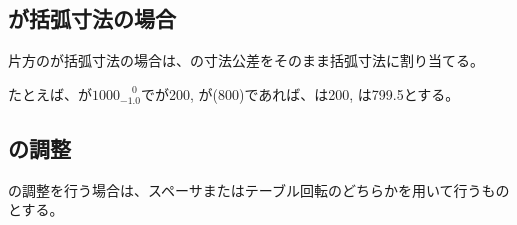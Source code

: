 \subsection{\AlocationLength が括弧寸法の場合}
片方の\AlocationLength が括弧寸法の場合は、\WorkTotalLength の寸法公差をそのまま括弧寸法に割り当てる。
\begin{hosoku}
たとえば、\WorkTotalLength が$1000^{\phantom +0}_{-1.0}$で\TopAlocationLength が200, \BottomAlocationLength が(800)であれば、\TopAlocationLength は200, \BottomAlocationLength は799.5とする。
\end{hosoku}


\subsection{\AlocationLength の調整}
\AlocationLength の調整を行う場合は、スペーサまたはテーブル回転のどちらかを用いて行うものとする。

